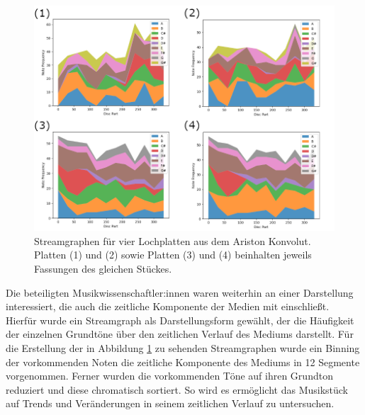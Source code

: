 \begin{figure}[t]
    \centering
    \includegraphics[width=\textwidth]{graphics/streamgraphs.png}
    \caption{Streamgraphen für vier Lochplatten aus dem Ariston Konvolut. Platten (1) und (2) sowie Platten (3) und (4) beinhalten jeweils Fassungen des gleichen Stückes.}
    \label{streamcharts}
\end{figure}

Die beteiligten Musikwissenschaftler:innen waren weiterhin an einer Darstellung interessiert, die auch die zeitliche Komponente der Medien mit einschließt.
Hierfür wurde ein Streamgraph als Darstellungsform gewählt, der die Häufigkeit der einzelnen Grundtöne über den zeitlichen Verlauf des Mediums darstellt.
Für die Erstellung der in Abbildung \ref{streamcharts} zu sehenden Streamgraphen wurde ein Binning der vorkommenden Noten die zeitliche Komponente des Mediums in 12 Segmente vorgenommen.
Ferner wurden die vorkommenden Töne auf ihren Grundton reduziert und diese chromatisch sortiert.
So wird es ermöglicht das Musikstück auf Trends und Veränderungen in seinem zeitlichen Verlauf zu untersuchen.

